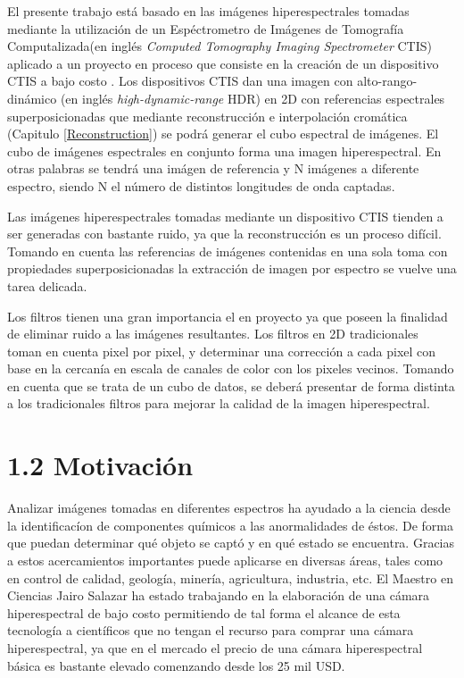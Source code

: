 El presente trabajo está basado en las imágenes hiperespectrales tomadas mediante la utilización de  un Espéctrometro de Imágenes de Tomografía Computalizada(en inglés \textit{Computed Tomography Imaging Spectrometer} CTIS) aplicado a un proyecto en proceso que consiste en la creación de un dispositivo CTIS a bajo costo \cite{JairoCamera}.
Los dispositivos CTIS dan una imagen con alto-rango-dinámico (en inglés \textit{high-dynamic-range} HDR) en 2D con referencias espectrales superposicionadas que mediante reconstrucción e interpolación cromática (Capitulo \ref{Reconstruction}) se podrá generar el cubo espectral de imágenes.
El cubo de imágenes espectrales en conjunto forma una imagen hiperespectral. 
En otras palabras se tendrá una imágen de referencia y N imágenes a diferente espectro, siendo N el número de distintos longitudes de onda captadas.

Las imágenes hiperespectrales tomadas mediante un dispositivo CTIS tienden a ser generadas con bastante ruido, ya que la reconstrucción es un proceso difícil. Tomando en cuenta las referencias de imágenes contenidas en una sola toma con propiedades superposicionadas la extracción de imagen por espectro se vuelve una tarea delicada.

Los filtros tienen una gran importancia el en proyecto ya que poseen la finalidad de eliminar ruido a las imágenes resultantes. 
Los filtros en  2D tradicionales toman en cuenta pixel por pixel, y determinar una corrección a cada pixel con base en la cercanía en escala de canales de color con los pixeles vecinos.
Tomando en cuenta que se trata de un cubo de datos, se deberá presentar de forma distinta a los tradicionales filtros para mejorar la calidad de la imagen hiperespectral.

\section{1.2 Motivación}

Analizar imágenes tomadas en diferentes espectros ha ayudado a la ciencia desde la identificacíon de componentes químicos a las anormalidades de éstos. De forma que puedan determinar qué objeto se captó y en qué estado se encuentra. 
Gracias a estos acercamientos importantes puede aplicarse en diversas áreas, tales como en control de calidad, geología, minería, agricultura, industria, etc\cite{Applications}.
El Maestro en Ciencias Jairo Salazar ha estado trabajando en la elaboración de una cámara hiperespectral de bajo costo\cite{JairoCamera}
permitiendo de tal forma el alcance de esta tecnología a científicos que no tengan el recurso para comprar una cámara hiperespectral, ya que en el mercado el precio de una cámara hiperespectral básica es bastante elevado comenzando desde los 25 mil USD. 

